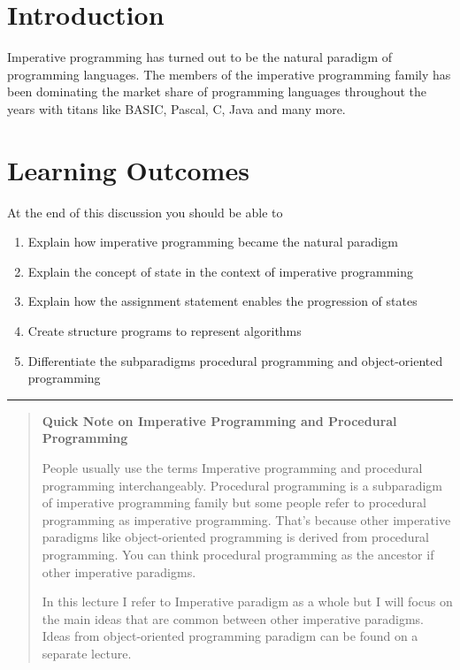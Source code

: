 \section{Introduction}\label{imperative-programming.md__introduction}

Imperative programming has turned out to be the natural paradigm of
programming languages. The members of the imperative programming family
has been dominating the market share of programming languages throughout
the years with titans like BASIC, Pascal, C, Java and many more.

\section{Learning
Outcomes}\label{imperative-programming.md__learning-outcomes}

At the end of this discussion you should be able to

\begin{enumerate}
\def\labelenumi{\arabic{enumi}.}
\tightlist
\item
  Explain how imperative programming became the natural paradigm
\item
  Explain the concept of state in the context of imperative programming
\item
  Explain how the assignment statement enables the progression of states
\item
  Create structure programs to represent algorithms
\item
  Differentiate the subparadigms procedural programming and
  object-oriented programming
\end{enumerate}

\begin{center}\rule{0.5\linewidth}{0.5pt}\end{center}

\begin{quote}
\textbf{Quick Note on Imperative Programming and Procedural Programming}

People usually use the terms Imperative programming and procedural
programming interchangeably. Procedural programming is a subparadigm of
imperative programming family but some people refer to procedural
programming as imperative programming. That's because other imperative
paradigms like object-oriented programming is derived from procedural
programming. You can think procedural programming as the ancestor if
other imperative paradigms.

In this lecture I refer to Imperative paradigm as a whole but I will
focus on the main ideas that are common between other imperative
paradigms. Ideas from object-oriented programming paradigm can be found
on a separate lecture.
\end{quote}

